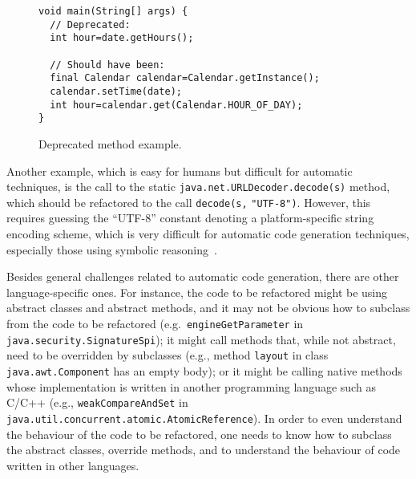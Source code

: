 \documentclass[conference]{IEEEtran}
\begin{document}
\begin{figure}[ht]
\begin{lstlisting}[mathescape=true,showstringspaces=false,basicstyle=\footnotesize]
void main(String[] args) {
  // Deprecated:
  int hour=date.getHours();
  
  // Should have been:
  final Calendar calendar=Calendar.getInstance();
  calendar.setTime(date);
  int hour=calendar.get(Calendar.HOUR_OF_DAY);
}
\end{lstlisting}
\caption{Deprecated method example.}
\label{ex:deprecated-method-other}
\end{figure}

Another example, which is easy for humans but difficult for automatic
techniques, is the call to the static
\lstinline[breaklines=true]{java.net.URLDecoder.decode(s)} method, which
should be refactored to the call
\lstinline{decode(s,} \lstinline{"UTF-8")}. 
However, this requires guessing the ``UTF-8'' constant denoting a
platform-specific string encoding scheme, which is very difficult for
automatic code generation techniques, especially those using symbolic
reasoning~\cite{DBLP:conf/cav/AbateDKKP18}.
%


Besides general challenges related to automatic code generation, there are other language-specific ones. For instance, the code to be refactored might be using abstract classes and abstract methods, and it may not be obvious how to subclass from the code to be refactored (e.g.~\lstinline[breaklines=true]{engineGetParameter} in \lstinline[breaklines=true]{java.security.SignatureSpi}); it might call methods that, while not abstract, need to be overridden by subclasses (e.g., method \lstinline[breaklines=true]{layout} in class \lstinline[breaklines=true]{java.awt.Component} has an empty body); or it might be calling native methods whose implementation is written in another programming language such as C/C++ (e.g., \lstinline[breaklines=true]{weakCompareAndSet} in \lstinline[breaklines=true]{java.util.concurrent.atomic.AtomicReference}). In order to even understand the behaviour of the code to be refactored, one needs to know how to subclass the abstract classes, override methods, and to understand the behaviour of code written in other languages.
\end{document}
